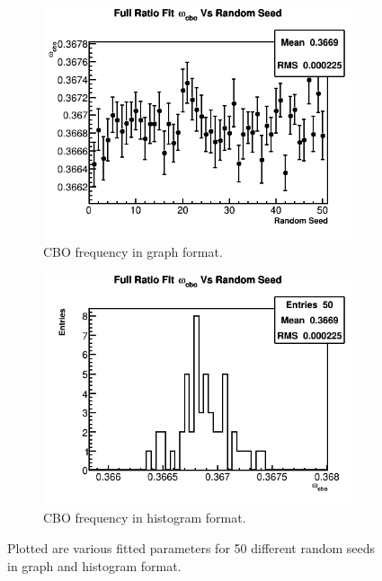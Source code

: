 \begin{figure}[]
		   	\begin{subfigure}[t]{0.45\textwidth}
			    \centering
				\includegraphics[width=\textwidth]{RatioCBO_omega_cbo_Vs_Iter_Canv}
			    \caption{CBO frequency in graph format.}
		    \end{subfigure}
		    \hspace{4mm}
		    \begin{subfigure}[t]{0.45\textwidth}
			    \centering
				\includegraphics[width=\textwidth]{RatioCBO_omega_cbo_Vs_Iter_Canv_hist}
			    \caption{CBO frequency in histogram format.}
		    \end{subfigure}%
		\caption[RandomSeedsPars2]{Plotted are various fitted parameters for 50 different random seeds in graph and histogram format.}
		\label{fig:RandomSeedsPars2}
		\end{figure}


